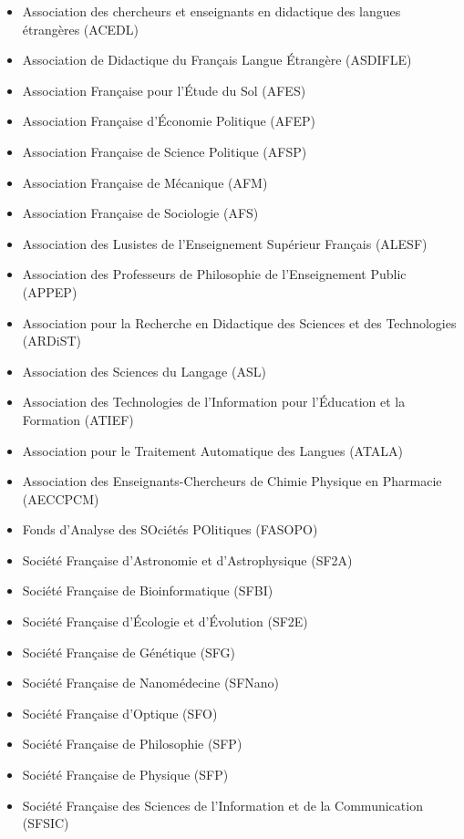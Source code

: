 \begin{itemize}
  \setlength{\itemsep}{1.5pt}
  \setlength{\parskip}{0pt}
  \setlength{\parsep}{0pt}
  \small\sffamily

  \item Association des chercheurs et enseignants en didactique des langues étrangères (ACEDL)
  \item Association de Didactique du Français Langue Étrangère (ASDIFLE)
  \item Association Française pour l’Étude du Sol (AFES)
  \item Association Française d'Économie Politique (AFEP) 
  \item Association Française de Science Politique (AFSP)
  \item Association Française de Mécanique (AFM)
  \item Association Française de Sociologie (AFS)
  \item Association des Lusistes de l’Enseignement Supérieur Français (ALESF)
  \item Association des Professeurs de Philosophie de l’Enseignement Public (APPEP)
  \item Association pour la Recherche en Didactique des Sciences et des Technologies (ARDiST)
  \item Association des Sciences du Langage (ASL)
  \item Association des Technologies de l’Information pour l’Éducation et la Formation (ATIEF)
  \item Association pour le Traitement Automatique des Langues (ATALA)
  \item Association des Enseignants-Chercheurs de Chimie Physique en Pharmacie (AECCPCM)
  \item Fonds d’Analyse des SOciétés POlitiques (FASOPO)
  \item Société Française d’Astronomie et d’Astrophysique (SF2A)
  \item Société Française de Bioinformatique (SFBI)
  \item Société Française d’Écologie et d’Évolution (SF2E)
  \item Société Française de Génétique (SFG)
  \item Société Française de Nanomédecine (SFNano)
  \item Société Française d’Optique (SFO)
  \item Société Française de Philosophie (SFP)
  \item Société Française de Physique (SFP)
  \item Société Française des Sciences de l’Information et de la Communication (SFSIC)

\end{itemize}
